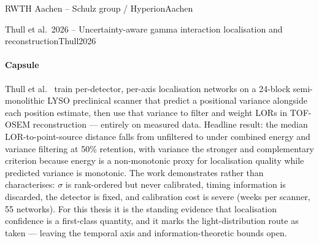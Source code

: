 \begin{programnote}{RWTH Aachen -- Schulz group / Hyperion}{Aachen}
\begin{papernote}{Thull et al.\ 2026 -- Uncertainty-aware gamma interaction localisation and reconstruction}{Thull2026}
\paragraph{Capsule}
Thull et al.\ \cite{Thull2026} train per-detector, per-axis localisation networks on a
24-block semi-monolithic LYSO preclinical scanner that predict a positional variance
alongside each position estimate, then use that variance to filter and weight LORs in
TOF-OSEM reconstruction --- entirely on measured data. Headline result: the median
LOR-to-point-source distance falls from  unfiltered to  under combined
energy and variance filtering at 50\% retention, with variance the stronger and
complementary criterion because energy is a non-monotonic proxy for localisation quality
while predicted variance is monotonic. The work demonstrates rather than characterises:
$\sigma$ is rank-ordered but never calibrated, timing information is discarded, the
detector is fixed, and calibration cost is severe (weeks per scanner, 55 networks).
For this thesis it is the standing evidence that localisation confidence is a
first-class quantity, and it marks the light-distribution route as taken --- leaving the
temporal axis and information-theoretic bounds open.


\end{papernote}
\end{programnote}
